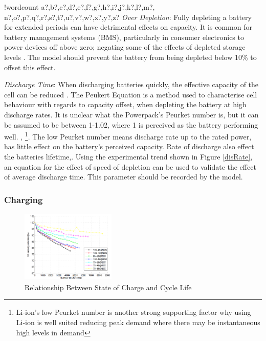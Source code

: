 \documentclass[fontsize=9.5pt]{extarticle}
\numberwithin{figure}{section} %
\newcounter{words}
\newenvironment{counted}{%
  \setcounter{words}{0}
  \SearchList!{wordcount}{\stepcounter{words}}
    {a?,b?,c?,d?,e?,f?,g?,h?,i?,j?,k?,l?,m?,
    n?,o?,p?,q?,r?,s?,t?,u?,v?,w?,x?,y?,z?}
  \UndoBoundary{'}
  \SearchOrder{p;}}{%
  \StopSearching}
\begin{document}
\begin{counted}
\emph{Over Depletion}: Fully depleting a battery for extended periods
can have detrimental effects on capacity. It is common for battery
management systems (BMS), particularly in consumer electronics to power
devices off above zero; negating some of the effects of depleted storage
levels \cite{Prematur82:online}. The model should prevent the battery
from being depleted below 10\% to offset this effect.

\emph{Discharge Time}: When discharging batteries quickly, the effective
capacity of the cell can be reduced \cite{BatteryP62:online}. The
Peukert Equation is a method used to characterise cell behaviour with
regards to capacity offset, when depleting the battery at high discharge
rates. It is unclear what the Powerpack's Peurket number is, but it can
be assumed to be between 1-1.02, where 1 is perceived as the battery
performing well. \cite{omar2012rechargeable}, \cite{omar2013peukert}
\footnote{Li-ion's low Peurket number is another strong supporting factor why using Li-ion is well suited reducing peak demand where there may be instantaneous high levels in demand}.
The low Peurket number means discharge rate up to the rated power, has
little effect on the battery's perceived capacity. Rate of discharge
also effect the batteries
lifetime\cite{BatteryL10:online},\cite{Effectso69:online}. Using the
experimental trend shown in Figure \ref{disRate}, an equation for the
effect of speed of depletion can be used to validate the effect of
average discharge time. This parameter should be recorded by the model.

\subsubsection{Charging}\label{charging}

\begin{figure}
\vspace{-55pt}
  \begin{center}
\includegraphics[trim = 0 0 0 0, clip, width=0.4\textwidth]{SoCgraph.png}
  \end{center}
  \vspace{-5pt}
\caption{Relationship Between State of Charge and Cycle Life \cite{xu2016modeling}}
  \label{SoCgraph}
  \vspace{-20pt}
\end{figure}


\end{counted}
\end{document}
